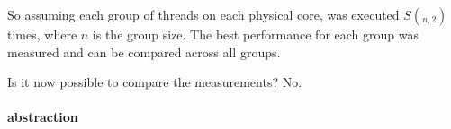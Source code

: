 So assuming each group of threads on each physical core, was executed
$S(_{n,2})$ times, where $n$ is the group size.
The best performance for each group was measured and can be compared across
all groups.

Is it now possible to compare the measurements?
No.


\paragraph{abstraction}
